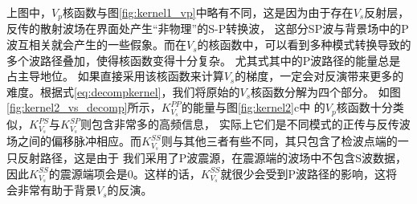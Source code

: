 上图中，$V_p$核函数与图\ref{fig:kernel1_vp}中略有不同，这是因为由于存在$V_s$反射层，反传的散射波场在界面处产生“非物理”的S-P转换波，
这部分SP波与背景场中的P波互相关就会产生的一些假象。而在$V_s$的核函数中，可以看到多种模式转换导致的多个波路径叠加，使得核函数变得十分复杂。
尤其式其中的P波路径的能量总是占主导地位。
如果直接采用该核函数来计算$V_s$的梯度，一定会对反演带来更多的难度。根据式\ref{eq:decompkernel}，我们将原始的$V_s$核函数分解为四个部分。
如图\ref{fig:kernel2_vs_decomp}所示，$K_{V_s}^{PP}$的能量与图\ref{fig:kernel2}c中
的$V_p$核函数十分类似，$K_{V_s}^{PS}$与$K_{V_s}^{SP}$则包含非常多的高频信息，
实际上它们是不同模式的正传与反传波场之间的偏移脉冲相应。而$K_{V_s}^{SS}$则与其他三者有些不同，其只包含了检波点端的一只反射路径，这是由于
我们采用了P波震源，在震源端的波场中不包含S波数据，因此$K_{V_s}^{SS}$的震源端项会是0。这样的话，$K_{V_s}^{SS}$就很少会受到P波路径的影响，这将
会非常有助于背景$V_s$的反演。
